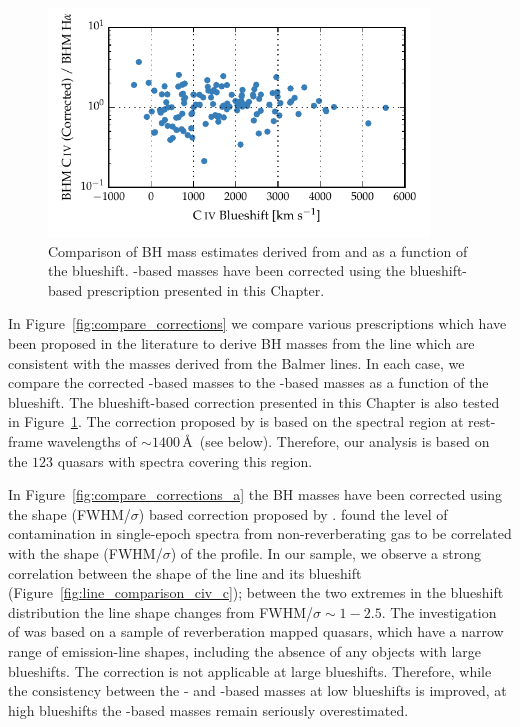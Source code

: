 \begin{figure}
    \centering 
    \includegraphics[width=0.9\textwidth]{figures/chapter03/corrections_coatman.pdf} 
    \caption[{}]{Comparison of BH mass estimates derived from  and \ha as a function of the  blueshift. -based masses have been corrected using the  blueshift-based prescription presented in this Chapter.}
    \label{fig:compare_corrections_coatman}
\end{figure}

In Figure~\ref{fig:compare_corrections} we compare various prescriptions which have been proposed in the literature to derive BH masses from the  line which are consistent with the masses derived from the Balmer lines. 
In each case, we compare the corrected -based masses to the \hans-based masses as a function of the  blueshift. 
The  blueshift-based correction presented in this Chapter is also tested in Figure~\ref{fig:compare_corrections_coatman}.
The correction proposed by \citet{runnoe13} is based on the spectral region at rest-frame wavelengths of $\sim$$1400$\,\AA\, (see below). 
Therefore, our analysis is based on the $123$ quasars with spectra covering this region. 

In Figure~\ref{fig:compare_corrections_a} the  BH masses have been corrected using the  shape (FWHM/$\sigma$) based correction proposed by \citet{denney12}. 
\citet{denney12} found the level of contamination in single-epoch spectra from non-reverberating gas to be correlated with the shape (FWHM/$\sigma$) of the  profile. 
In our sample, we observe a strong correlation between the shape of the  line and its blueshift (Figure~\ref{fig:line_comparison_civ_c}); between the two extremes in the  blueshift distribution the line shape changes from FWHM/$\sigma\sim1-2.5$. 
The investigation of \citet{denney12} was based on a sample of reverberation mapped quasars, which have a narrow range of  emission-line shapes, including the absence of any objects with large  blueshifts. 
The correction is not applicable at large  blueshifts. 
Therefore, while the consistency between the \hans- and -based masses at low  blueshifts is improved, at high  blueshifts the -based masses remain seriously overestimated.

